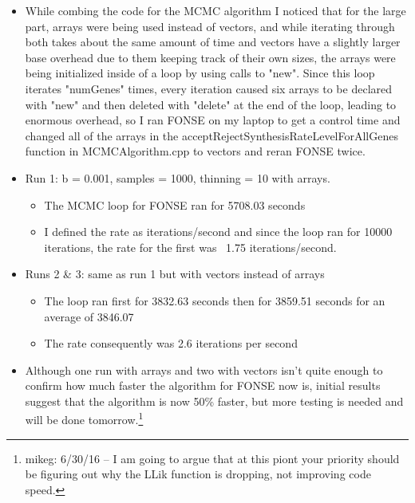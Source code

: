 \documentclass[11pt]{labbook}
\begin{document}
    \begin{itemize}
        \item While combing the code for the MCMC algorithm I noticed that for the large part, arrays were being used instead of vectors, and while iterating through both takes about the same amount of time and vectors have a slightly larger base overhead due to them keeping track of their own sizes, the arrays were being initialized inside of a loop by using calls to "new". Since this loop iterates "numGenes" times, every iteration caused six arrays to be declared with "new" and then deleted with "delete" at the end of the loop, leading to enormous overhead, so I ran FONSE on my laptop to get a control time and changed all of the arrays in the acceptRejectSynthesisRateLevelForAllGenes function in MCMCAlgorithm.cpp to vectors and reran FONSE twice.
        \item Run 1: b = 0.001, samples = 1000, thinning = 10 with arrays.
            \begin{itemize}
                \item The MCMC loop for FONSE ran for 5708.03 seconds
                \item I defined the rate as iterations/second and since the loop ran for 10000 iterations, the rate for the first was ~1.75 iterations/second.
            \end{itemize}
        \item Runs 2 \& 3: same as run 1 but with vectors instead of arrays
            \begin{itemize}
                \item The loop ran first for 3832.63 seconds then for 3859.51 seconds for an average of 3846.07
                \item The rate consequently was 2.6 iterations per second
            \end{itemize}
        \item Although one run with arrays and two with vectors isn't quite enough to confirm how much faster the algorithm for FONSE now is, initial results suggest that the algorithm is now 50\% faster, but more testing is needed and will be done tomorrow.\footnote{mikeg: 6/30/16 -- I am going to argue that at this piont your priority should be figuring out why the LLik function is dropping, not improving code speed.}
    \end{itemize}
    
\end{document}
